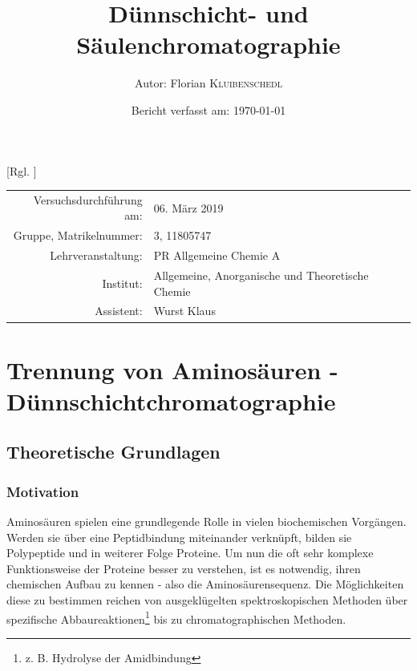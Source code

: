 \documentclass{article}
\title{Dünnschicht- und Säulenchromatographie \cite{Versuchsvorschrift}} %
\author{Autor: Florian \textsc{Kluibenschedl}} %
\date{Bericht verfasst am: \today} %
\begin{document}
  [Rgl. ]{}{}
  
  \maketitle %
  
  \begin{center}
    \begin{tabular}{r p{4cm}}
      Versuchsdurchführung am: & 06. März 2019\\ %
      Gruppe, Matrikelnummer: & 3, 11805747 \\
      Lehrveranstaltung: & PR Allgemeine Chemie A \\
      Institut: & Allgemeine, Anorganische und Theoretische Chemie \\
      Assistent: & Wurst Klaus %
    \end{tabular}
  \end{center}


  \begin{abstract}
    
  \end{abstract}
  
  \pagebreak
  
  \section{Trennung von Aminosäuren - Dünnschichtchromatographie}
  
    \subsection{Theoretische Grundlagen}
  
      \subsubsection{Motivation} \label{sec:Motivation}
        
        Aminosäuren spielen eine grundlegende Rolle in vielen biochemischen Vorgängen. Werden sie über eine Peptidbindung miteinander verknüpft, bilden sie Polypeptide und in weiterer Folge Proteine. Um nun die oft sehr komplexe Funktionsweise der Proteine besser zu verstehen, ist es notwendig, ihren chemischen Aufbau zu kennen - also die Aminosäurensequenz. Die Möglichkeiten diese zu bestimmen reichen von ausgeklügelten spektroskopischen Methoden über spezifische Abbaureaktionen\footnote{z. B. Hydrolyse der Amidbindung} bis zu chromatographischen Methoden. 
        
\end{document}
